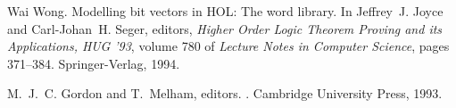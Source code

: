 \begin{thebibliography}{99}

Wai Wong.
\newblock Modelling bit vectors in {HOL}: The word library.
\newblock In Jeffrey~J. Joyce and Carl-Johan~H. Seger, editors, {\em Higher
  Order Logic Theorem Proving and its Applications, {HUG} '93}, volume 780 of
  {\em Lecture Notes in Computer Science}, pages 371--384. Springer-Verlag,
  1994.

M.~J.~C. Gordon and T.~Melham, editors.
.
\newblock Cambridge University Press, 1993.

\end{thebibliography}


